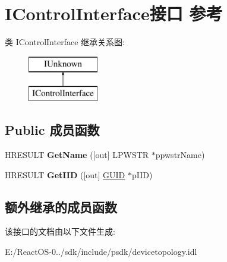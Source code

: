 \hypertarget{interface_i_control_interface}{}\section{I\+Control\+Interface接口 参考}
\label{interface_i_control_interface}
类 I\+Control\+Interface 继承关系图\+:\begin{figure}[H]
\begin{center}
\leavevmode
\includegraphics[height=2.000000cm]{interface_i_control_interface}
\end{center}
\end{figure}
\subsection*{Public 成员函数}
\begin{DoxyCompactItemize}
\item 
\mbox{\label{interface_i_control_interface_a837a95961282fc767896fde06ce6f36c}} 
H\+R\+E\+S\+U\+LT {\bfseries Get\+Name} (\mbox{[}out\mbox{]} L\+P\+W\+S\+TR $\ast$ppwstr\+Name)
\item 
\mbox{\label{interface_i_control_interface_a8b750071d52eef4a80942db8e8089911}} 
H\+R\+E\+S\+U\+LT {\bfseries Get\+I\+ID} (\mbox{[}out\mbox{]} \hyperlink{interface_g_u_i_d}{G\+U\+ID} $\ast$p\+I\+ID)
\end{DoxyCompactItemize}
\subsection*{额外继承的成员函数}


该接口的文档由以下文件生成\+:\begin{DoxyCompactItemize}
\item 
E\+:/\+React\+O\+S-\/0../sdk/include/psdk/devicetopology.\+idl\end{DoxyCompactItemize}
